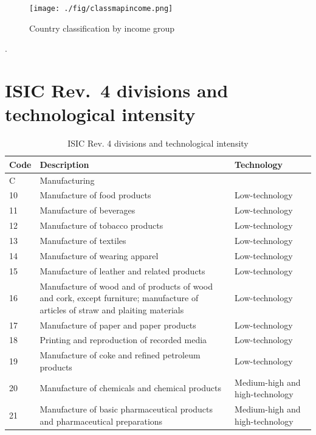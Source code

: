 \documentclass[
  openany, nofonts]{tufte-book}
\begin{document}
\begin{figure}
\texttt{[image: ./fig/classmapincome.png]} \caption[Country classification by income group]{Country classification by income group}\label{fig:c99-classmapincome}
\end{figure}

.
\pagebreak

\hypertarget{isic-rev.-4-divisions-and-technological-intensity}{%
\section{ISIC Rev.~4 divisions and technological intensity}\label{isic-rev.-4-divisions-and-technological-intensity}}

\begin{table}[!h]

\caption{\label{tab:c99-ISICtab}ISIC Rev. 4 divisions and technological intensity}
\centering
\fontsize{10}{12}\selectfont
\begin{tabular}[t]{l>{\raggedright\arraybackslash}p{6cm}l}
\toprule
Code & Description & Technology\\
\midrule
C & Manufacturing & \\
10 & Manufacture of food products & Low-technology\\
11 & Manufacture of beverages & Low-technology\\
12 & Manufacture of tobacco products & Low-technology\\
13 & Manufacture of textiles & Low-technology\\
14 & Manufacture of wearing apparel & Low-technology\\
15 & Manufacture of leather and related products & Low-technology\\
16 & Manufacture of wood and of products of wood and cork, except furniture; manufacture of articles of straw and plaiting materials & Low-technology\\
17 & Manufacture of paper and paper products & Low-technology\\
18 & Printing and reproduction of recorded media & Low-technology\\
19 & Manufacture of coke and refined petroleum products & Low-technology\\
20 & Manufacture of chemicals and chemical products & Medium-high and high-technology\\
21 & Manufacture of basic pharmaceutical products and pharmaceutical preparations & Medium-high and high-technology\\

\end{tabular}
\end{table}
\end{document}
